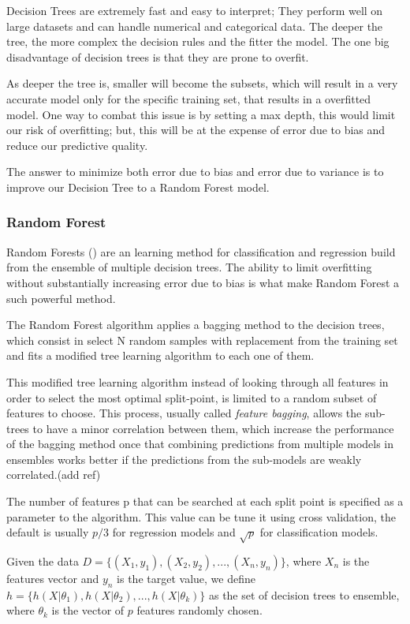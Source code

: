 \documentclass[12pt]{report}
\begin{document}
Decision Trees are extremely fast and easy to interpret; They perform well on large datasets and can handle numerical and categorical data. The deeper the tree, the more complex the decision rules and the fitter the model. The one big disadvantage of decision trees is that they are prone to overfit.

As deeper the tree is, smaller will become the subsets, which will result in a very accurate model only for the specific training set, that results in a overfitted model. One way to combat this issue is by setting a max depth, this would limit our risk of overfitting; but, this will be at the expense of error due to bias and reduce our predictive quality.

The answer to minimize both error due to bias and error due to variance is to improve our Decision Tree to a Random Forest model.

\subsubsection{Random Forest}

Random Forests (\citet{Breiman2001}) are an learning method for classification and regression build from the ensemble of multiple decision trees. The ability to limit overfitting without substantially increasing error due to bias is what make Random Forest a such powerful method.

The Random Forest algorithm applies a bagging method to the decision trees, which consist in select N random samples with replacement from the training set and fits a modified tree learning algorithm to each one of them.

This modified tree learning algorithm instead of looking through all features in order to select the most optimal split-point, is limited to a random subset of features to choose. This process, usually called \textit{feature bagging}, allows the sub-trees to have a minor correlation between them, which increase the performance of the bagging method once that combining predictions from multiple models in ensembles works better if the predictions from the sub-models are weakly correlated.(add ref)

The number of features p that can be searched at each split point is specified as a parameter to the algorithm. This value can be tune it using cross validation, the default is usually $p/3$ for regression models and $\sqrt{p}$ for classification models.

Given the data $D=\{(X_1,y_1), (X_2,y_2), ... ,(X_n, y_n)\}$, where $X_n$ is the features vector and $y_n$ is the target value, we define $h = \{h(X|\theta_1), h(X|\theta_2), ...,h(X|\theta_k)\}$ as the set of decision trees to ensemble, where $\theta_k$ is the vector of $p$ features randomly chosen. 
\end{document}
